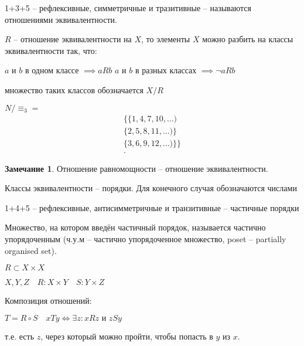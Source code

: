 \documentclass{book}
\theoremstyle{definition}
\newtheorem*{note}{Замечание}
\begin{document}
        \begin{definition}
            1+3+5 -- рефлексивные, симметричные и тразитивные -- называются отношениями эквивалентности. 
        \end{definition}
        \begin{theorem}
            $R$ -- отношение эквивалентности на $X$, то элементы $X$ можно разбить на классы эквивалентности так, что:

            $a$ и $b$  в одном классе $\implies  aRb$
            $a$ и $b$  в разных  классах $\implies \neg aRb$

            множество таких классов обозначается $X / R$

            $N / \equiv_3 = $
            \begin{align*}
                \{\{1,4,7,10,\ldots)\\
                        \{2,5,8,11,\ldots)\}\\
                        \{3,6,9,12,\ldots)\}\}\\
            .\end{align*}   
        \end{theorem}
        \begin{note}
            Отношение равномощности -- отношение эквивалентности.

            Классы эквивалентности -- порядки. Для конечного случая обозначаются числами
        \end{note}

        \begin{definition}
            1+4+5 -- рефлексивные, антисимметричные и транзитивные -- частичные порядки

            Множество, на котором введён частичный порядок, называется частично упорядоченным (ч.у.м -- частично упорядоченное множество, poset -- partially organised set).
        \end{definition}
        
        $R\subset X\times X$

   $X, Y, Z\quad R:X\times Y\quad S:Y\times Z$

   \begin{definition}
       Композиция отношений: 

       $T = R\circ S\quad xTy \iff \exists z: xRz \text{ и } zSy$

       т.е. есть $z$, через который можно пройти, чтобы попасть в $y$ из $x$.
   \end{definition}
\end{document}
